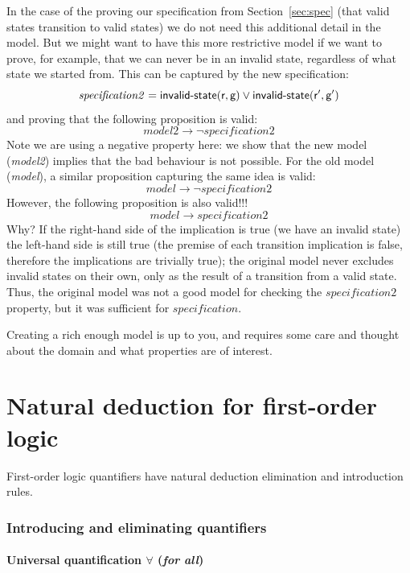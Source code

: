 In the case of the proving our specification from
Section~\ref{sec:spec} (that valid states transition to valid states)
we do not need this additional detail in the model. But we might want
to have this more restrictive model if we want to prove, for example,
that we can never be in an invalid state, regardless of what state we
started from. This can be captured by the new specification:
%
\begin{equation*}
\mathit{specification2} = \textsf{invalid-state}(\textsf{r}, \textsf{g})
\vee \textsf{invalid-state}(\textsf{r}', \textsf{g}')
\end{equation*}
%
and proving that the following proposition is valid:
$$
\mathit{model2} \rightarrow
\neg \mathit{specification2}
$$
Note we are using a negative property
here: we show that the new model (\textit{model2}) implies that the bad behaviour is not possible.
For the old model (\textit{model}), a similar proposition capturing the same idea is valid:
$$
\mathit{model} \rightarrow \neg \mathit{specification2}
$$
However, the following proposition is also valid!!!
$$
\mathit{model} \rightarrow \mathit{specification2}
$$
Why? If the right-hand side of the implication is true (we have an
invalid state) the left-hand side is still true (the premise of each
transition implication is false, therefore the implications are
trivially true); the original model never excludes invalid states on
their own, only as the result of a transition from a valid
state. Thus, the original model was not a good model for checking the
$\mathit{specification2}$ property, but it was sufficient for
$\mathit{specification}$.

Creating a rich enough model is up to you, and requires some care and
thought about the domain and what properties are of interest.

\part{Natural deduction for first-order logic}
\setcounter{section}{0}

First-order logic quantifiers have natural deduction elimination and introduction rules.

\section{Introducing and eliminating quantifiers}

\subsection{Universal quantification $\forall$ (\emph{for all})}

